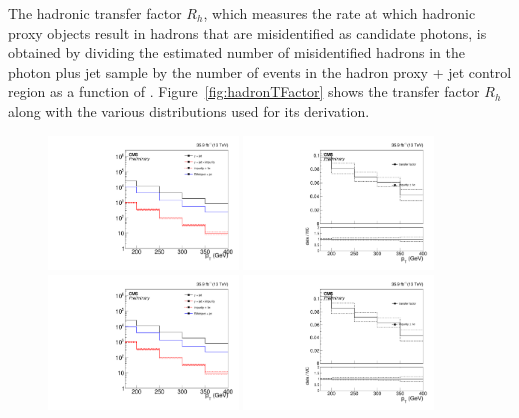 The hadronic transfer factor $R_{h}$, which measures the rate at which hadronic proxy objects result in hadrons that are misidentified as candidate photons, is obtained by dividing the estimated number of misidentified hadrons in the photon plus jet sample by the number of events in the hadron proxy + jet control region as a function of \pt. 
Figure~\ref{fig:hadronTFactor} shows the transfer factor $R_{h}$ along with the various distributions used for its derivation.

\begin{figure}[htbp]
  \begin{center}
    \includegraphics[width=0.45\textwidth]{Analysis/Figures/hfake/distributionsNom.pdf}
    \includegraphics[width=0.45\textwidth]{Analysis/Figures/hfake/tfactorNom.pdf}
    \includegraphics[width=0.45\textwidth]{Analysis/Figures/hfake/distributionsTight.pdf}
    \includegraphics[width=0.45\textwidth]{Analysis/Figures/hfake/tfactorTight.pdf}

\end{center}
\end{figure}
